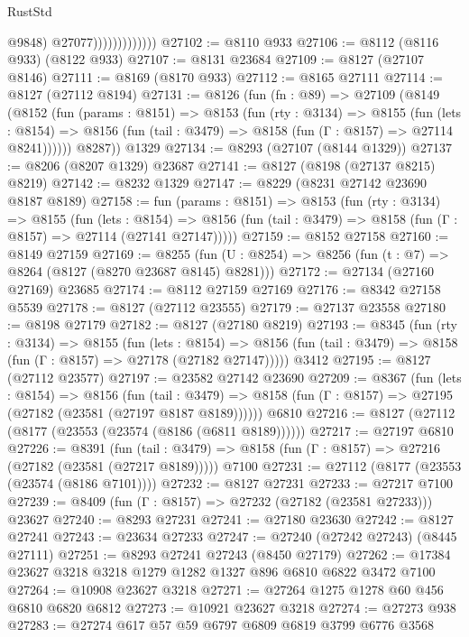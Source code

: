 \begin{lexlean}{RustStd}
\begin{coremodule}
                                @9848)
                              @27077)))))))))))))
@27102 := @8110 @933
@27106 := @8112 (@8116 @933) (@8122 @933)
@27107 := @8131 @23684
@27109 := @8127 (@27107 @8146)
@27111 := @8169 (@8170 @933)
@27112 := @8165 @27111
@27114 := @8127 (@27112 @8194)
@27131 := @8126
    (fun (fn : @89) =>
    @27109
      (@8149
        (@8152
          (fun (params : @8151) =>
          @8153
            (fun (rty : @3134) =>
            @8155
              (fun (lets : @8154) =>
              @8156 (fun (tail : @3479) => @8158 (fun (Γ : @8157) => @27114 @8241))))))
        @8287))
    @1329
@27134 := @8293 (@27107 (@8144 @1329))
@27137 := @8206 (@8207 @1329) @23687
@27141 := @8127 (@8198 (@27137 @8215) @8219)
@27142 := @8232 @1329
@27147 := @8229 (@8231 @27142 @23690 @8187 @8189)
@27158 := fun (params : @8151) =>
  @8153
    (fun (rty : @3134) =>
    @8155
      (fun (lets : @8154) =>
      @8156 (fun (tail : @3479) => @8158 (fun (Γ : @8157) => @27114 (@27141 @27147)))))
@27159 := @8152 @27158
@27160 := @8149 @27159
@27169 := @8255
    (fun (U : @8254) => @8256 (fun (t : @7) => @8264 (@8127 (@8270 @23687 @8145) @8281)))
@27172 := @27134 (@27160 @27169) @23685
@27174 := @8112 @27159 @27169
@27176 := @8342 @27158 @5539
@27178 := @8127 (@27112 @23555)
@27179 := @27137 @23558
@27180 := @8198 @27179
@27182 := @8127 (@27180 @8219)
@27193 := @8345
    (fun (rty : @3134) =>
    @8155
      (fun (lets : @8154) =>
      @8156 (fun (tail : @3479) => @8158 (fun (Γ : @8157) => @27178 (@27182 @27147)))))
    @3412
@27195 := @8127 (@27112 @23577)
@27197 := @23582 @27142 @23690
@27209 := @8367
    (fun (lets : @8154) =>
    @8156
      (fun (tail : @3479) =>
      @8158 (fun (Γ : @8157) => @27195 (@27182 (@23581 (@27197 @8187 @8189))))))
    @6810
@27216 := @8127 (@27112 (@8177 (@23553 (@23574 (@8186 (@6811 @8189))))))
@27217 := @27197 @6810
@27226 := @8391
    (fun (tail : @3479) => @8158 (fun (Γ : @8157) => @27216 (@27182 (@23581 (@27217 @8189)))))
    @7100
@27231 := @27112 (@8177 (@23553 (@23574 (@8186 @7101))))
@27232 := @8127 @27231
@27233 := @27217 @7100
@27239 := @8409 (fun (Γ : @8157) => @27232 (@27182 (@23581 @27233))) @23627
@27240 := @8293 @27231
@27241 := @27180 @23630
@27242 := @8127 @27241
@27243 := @23634 @27233
@27247 := @27240 (@27242 @27243) (@8445 @27111)
@27251 := @8293 @27241 @27243 (@8450 @27179)
@27262 := @17384 @23627 @3218 @3218 @1279 @1282 @1327 @896 @6810 @6822 @3472 @7100
@27264 := @10908 @23627 @3218
@27271 := @27264 @1275 @1278 @60 @456 @6810 @6820 @6812
@27273 := @10921 @23627 @3218
@27274 := @27273 @938
@27283 := @27274 @617 @57 @59 @6797 @6809 @6819 @3799 @6776 @3568

\end{coremodule}
\end{lexlean}
